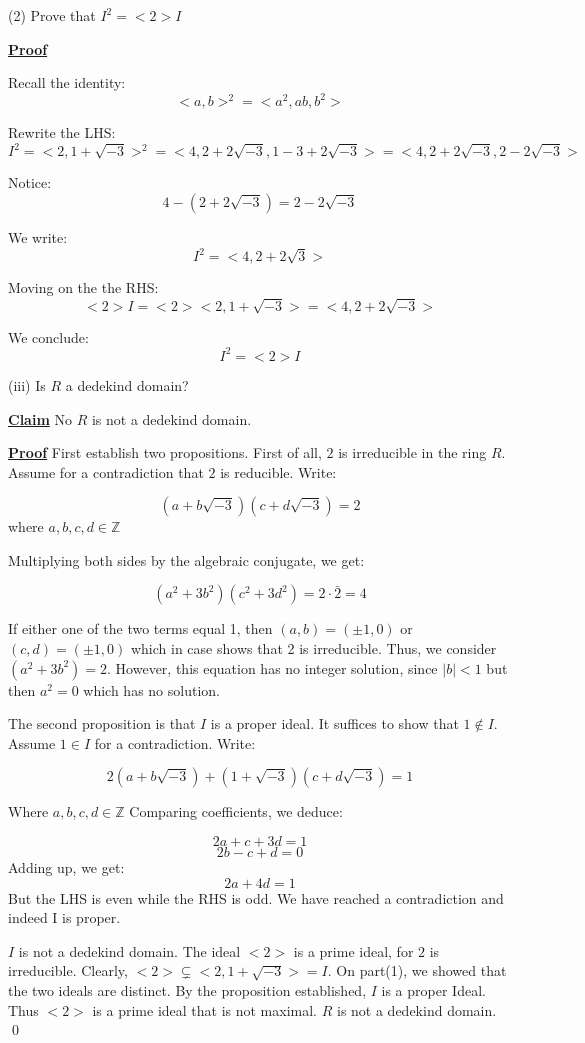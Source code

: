 \documentclass{article}
\newcommand{\new}[1]{
    \vspace{2mm}
    \noindent
    \textbf{
    \underline{#1}}
}
\newcommand{\Proof}{{
    \vspace{2mm}
    \noindent
    \textbf{
    \underline{Proof}}
}
}
\begin{document}
(2) Prove that $I^2 = <2>I$

\Proof
Recall the identity:
\[
    <a, b>^2 = <a^2, ab, b^2>
\]

Rewrite the LHS:
\[
    I^2 = <2, 1+\sqrt{-3}>^2
    =<4, 2+2\sqrt{-3}, 1-3+2\sqrt{-3}>
    =<4, 2+2\sqrt{-3}, 2-2\sqrt{-3}>
\]

Notice:
\[
    4-(2+2\sqrt{-3}) = 2-2\sqrt{-3}
\]

We write:
\[
    I^2 = <4, 2+2\sqrt{3}>
\]

Moving on the the RHS:
\[
    <2>I = <2><2, 1+\sqrt{-3}> = <4, 2+2\sqrt{-3}>
\]

We conclude:
\[
    I^2 = <2>I
\]

(iii) Is $R$ a dedekind domain?

\new{Claim} No $R$ is not a dedekind domain.

\Proof First establish two propositions. 
First of all, $2$ is irreducible in the 
ring $R$. Assume for a contradiction that 
$2$ is reducible. Write:

\[
    (a + b\sqrt{-3}) 
    (c + d\sqrt{-3})
    = 2
\]
where $a, b, c, d \in \mathbb{Z}$

Multiplying both sides by the algebraic 
conjugate, we get:

\[
    (a^2+3b^2)(c^2+3d^2) = 2 \cdot
    \bar{2} = 4
\]

If either one of the two terms equal 1, 
then $(a, b) = (\pm1, 0)$ 
or $(c, d) = (\pm1, 0)$
which in case shows that 2 is irreducible. 
Thus, we consider 
$(a^2+3b^2) = 2$. 
However, this equation has no integer solution,
since $|b| < 1$ but then $a^2 = 0$ which has 
no solution. 

The second proposition is that $I$ is 
a proper ideal. It suffices to show 
that $1 \notin I$. Assume $1 \in I$ 
for a contradiction. Write:

\[
    2(a+b\sqrt{-3})+(1+\sqrt{-3})
    (c+d\sqrt{-3}) = 1
\]

Where $a, b, c, d \in \mathbb{Z}$
Comparing coefficients, we deduce:

\[
    2a+c+3d = 1
\]
\[
    2b-c+d = 0
\]
Adding up, we get:
\[
    2a+4d = 1
\]
But the LHS is even while the RHS is odd. We 
have reached a contradiction and indeed I is proper. 

$I$ is not a dedekind domain. The ideal 
$<2>$ is a prime ideal, for $2$ is irreducible. 
Clearly, $<2> \subsetneq <2, 1+\sqrt{-3}> = I$. 
On part(1), we showed that the two ideals are 
distinct. By the proposition established, $I$ 
is a proper Ideal. Thus $<2>$ is a prime ideal 
that is not maximal. $R$ is not a dedekind domain. 
\qed
\end{document}
